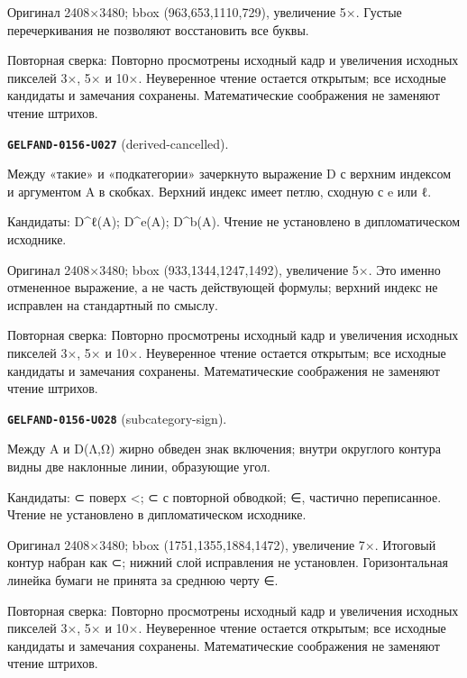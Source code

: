 Оригинал 2408×3480; bbox (963,653,1110,729), увеличение 5×. Густые перечеркивания не позволяют восстановить все буквы.\par
Повторная сверка: Повторно просмотрены исходный кадр и увеличения исходных пикселей 3×, 5× и 10×. Неуверенное чтение остается открытым; все исходные кандидаты и замечания сохранены. Математические соображения не заменяют чтение штрихов.\par\medskip
\par\noindent\leavevmode{}\label{GELFAND-0156-U027}\label{GELFAND-P001444:derived-cancelled}\textbf{\texttt{GELFAND-0156-U027}} (derived-cancelled).\nopagebreak[4]\par
Между «такие» и «подкатегории» зачеркнуто выражение D с верхним индексом и аргументом A в скобках. Верхний индекс имеет петлю, сходную с e или ℓ.\par
Кандидаты: D\textasciicircum{}ℓ(A); D\textasciicircum{}e(A); D\textasciicircum{}b(A). Чтение не установлено в дипломатическом исходнике.\par
Оригинал 2408×3480; bbox (933,1344,1247,1492), увеличение 5×. Это именно отмененное выражение, а не часть действующей формулы; верхний индекс не исправлен на стандартный по смыслу.\par
Повторная сверка: Повторно просмотрены исходный кадр и увеличения исходных пикселей 3×, 5× и 10×. Неуверенное чтение остается открытым; все исходные кандидаты и замечания сохранены. Математические соображения не заменяют чтение штрихов.\par\medskip
\par\noindent\leavevmode{}\label{GELFAND-0156-U028}\label{GELFAND-P001444:subcategory-sign}\textbf{\texttt{GELFAND-0156-U028}} (subcategory-sign).\nopagebreak[4]\par
Между A и D(Λ,Ω) жирно обведен знак включения; внутри округлого контура видны две наклонные линии, образующие угол.\par
Кандидаты: ⊂ поверх <; ⊂ с повторной обводкой; ∈, частично переписанное. Чтение не установлено в дипломатическом исходнике.\par
Оригинал 2408×3480; bbox (1751,1355,1884,1472), увеличение 7×. Итоговый контур набран как ⊂; нижний слой исправления не установлен. Горизонтальная линейка бумаги не принята за среднюю черту ∈.\par
Повторная сверка: Повторно просмотрены исходный кадр и увеличения исходных пикселей 3×, 5× и 10×. Неуверенное чтение остается открытым; все исходные кандидаты и замечания сохранены. Математические соображения не заменяют чтение штрихов.\par\medskip
